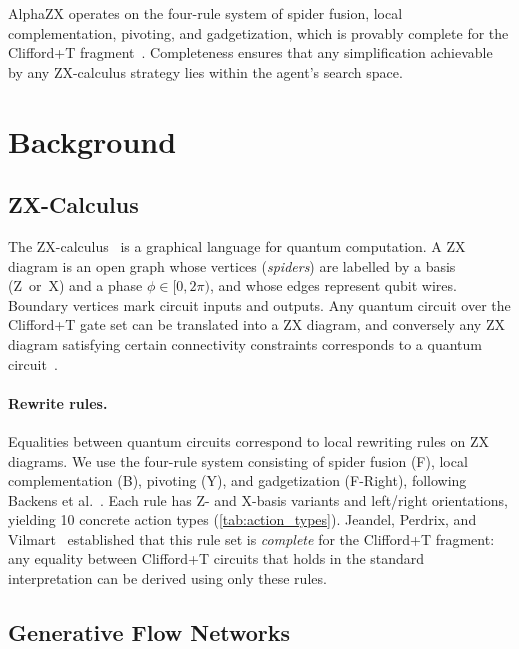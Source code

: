 \documentclass[11pt,a4paper]{article}
\begin{document}
AlphaZX operates on the four-rule system of spider fusion, local
complementation, pivoting, and gadgetization, which is provably complete
for the Clifford+T fragment~\cite{jeandel2018complete,
backens2021completeness}.  Completeness ensures that any simplification
achievable by any ZX-calculus strategy lies within the agent's search
space.


\section{Background}\label{sec:background}

\subsection{ZX-Calculus}\label{sec:bg_zx}

The ZX-calculus~\cite{coecke2011interacting} is a graphical language for
quantum computation.  A ZX diagram is an open graph whose vertices
(\emph{spiders}) are labelled by a basis (Z~or~X) and a phase
$\phi \in [0, 2\pi)$, and whose edges represent qubit wires.  Boundary
vertices mark circuit inputs and outputs.  Any quantum circuit over the
Clifford+T gate set can be translated into a ZX diagram, and conversely
any ZX diagram satisfying certain connectivity constraints corresponds to
a quantum circuit~\cite{backens2021completeness}.

\paragraph{Rewrite rules.}
Equalities between quantum circuits correspond to local rewriting rules
on ZX diagrams.  We use the four-rule system consisting of spider fusion
(F), local complementation (B), pivoting (Y), and gadgetization
(F-Right), following Backens et al.~\cite{backens2021completeness}.  Each
rule has Z- and X-basis variants and left/right orientations, yielding 10
concrete action types (\cref{tab:action_types}).  Jeandel, Perdrix, and
Vilmart~\cite{jeandel2018complete} established that this rule set is
\emph{complete} for the Clifford+T fragment: any equality between
Clifford+T circuits that holds in the standard interpretation can be
derived using only these rules.


\subsection{Generative Flow Networks}\label{sec:bg_gflownet}
\end{document}

